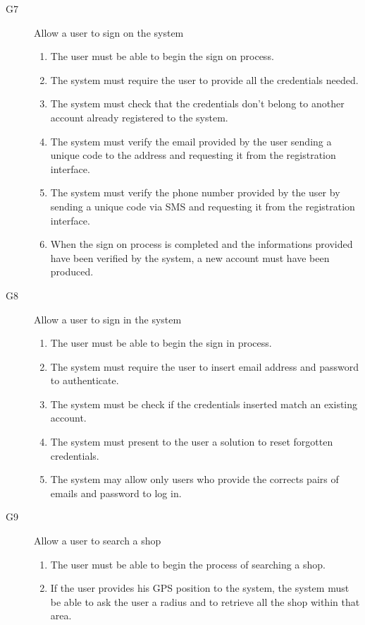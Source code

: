 \begin{description}
\begin{enumerate}[resume*]
        \end{enumerate}
    \item [G7] Allow a user to sign on the system
        \begin{enumerate}[resume*]
            \item The user must be able to begin the sign on process.
            \item The system must require the user to provide all the credentials needed.
            \item The system must check that the credentials don't belong to another account already registered to the system.
            \item The system must verify the email provided by the user sending a unique code to the address and requesting it from the registration interface.
            \item The system must verify the phone number provided by the user by sending a unique code via SMS and requesting it from the registration interface.
            \item When the sign on process is completed and the informations provided have been verified by the system, a new account must have been produced.
        \end{enumerate}
    \item [G8] Allow a user to sign in the system
        \begin{enumerate}[resume*]
            \item The user must be able to begin the sign in process.
            \item The system must require the user to insert email address and password to authenticate.
            \item The system must be check if the credentials inserted match an existing account.
            \item The system must present to the user a solution to reset forgotten credentials.
            \item The system may allow only users who provide the corrects pairs of emails and password to log in.
        \end{enumerate}
    \item [G9] Allow a user to search a shop
        \begin{enumerate}[resume*]
            \item The user must be able to begin the process of searching a shop.
            \item If the user provides his GPS position to the system, the system must be able to ask the user a radius and to retrieve all the shop within that area.

\end{enumerate}
\end{description}

